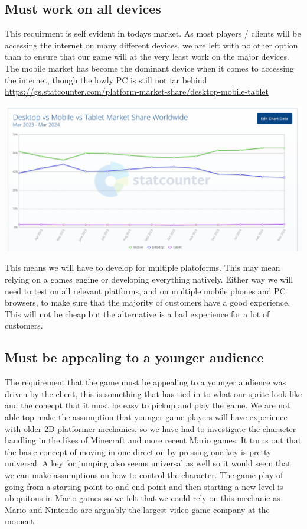 \documentclass{article}
\begin{document}
\subsection{ Must work on all devices }
This requirment is self evident in todays market. As most players / clients will be accessing the internet on many different devices, we are left with no other option than to ensure that our game will at the very least work on the major devices.
The mobile market has become the dominant device when it comes to accessing the internet, though the lowly PC is still not far behind \url{https://gs.statcounter.com/platform-market-share/desktop-mobile-tablet}

\includegraphics[scale=0.5]{MobileVsPC}

This means we will have to develop for multiple platoforms. This may mean relying on a games engine or developing everything natively. Either way we will need to test on all relevant platforms, and on multiple mobile phones and PC browsers, to make sure that the majority of customers have a good experience. This will not be cheap but the alternative is a bad experience for a lot of customers.

\subsection{ Must be appealing to a younger audience }
The requirement that the game must be appealing to a younger audience was driven by the client, this is something that has tied in to what our sprite look like and the conecpt that it must be easy to pickup and play the game.
We are not able top make the assumption that younger game players will have experience with older 2D platformer mechanics, so we have had to investigate the character handling in the likes of Minecraft and more recent Mario games. It turns out that the basic concept of moving in one direction by pressing one key is pretty universal. A key for jumping also seems universal as well so it would seem that we can make assumptions on how to control the character.
The game play of going from a starting point to and end point and then starting a new level is ubiquitous in Mario games so we felt that we could rely on this mechanic as Mario and Nintendo are arguably the largest video game company at the moment.
\end{document}
